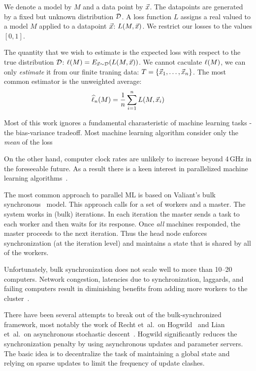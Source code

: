 We denote a model by $M$ and a data point by $\vec{x}$. The datapoints are
generated by a fixed but unknown distribution ${\cal D}$. A loss function $L$
assigns a real valued to a model $M$ applied to a datapoint $\vec{x}$:
$L(M,\vec{x})$. We restrict our losses to the values $[0,1]$.

The quantity that we wish to estimate is the expected loss with
respect to the true distribution ${\cal D}$: $\ell(M) = E_{\vec{x} \sim
  {\cal D}}(L(M,\vec{x}))$. We cannot caculate $\ell(M)$, we can only
{\em estimate} it from our finite traning data: $T = \{ \vec{x}_1, \ldots,
\vec{x}_n\}$. The most common estimator is the unweighted average:
$$ \widehat{\ell}_n(M) = \frac{1}{n} \sum_{i=1}^n L(M,\vec{x}_i)$$




Most of this work ignores a fundamental charasteristic
of machine learning tasks - the bias-variance tradeoff. Most machine
learning algorithm consider only the {\em mean} of the loss

On the other hand, computer clock rates are unlikely to increase
beyond 4\,GHz in the foreseeable future.  As a result there is a keen
interest in parallelized machine
learning algorithms~\cite{bekkerman_scaling_2012}.

The most common approach to parallel ML is based on Valiant's bulk
synchronous~\cite{valiant_bridging_1990} model. This approach calls for a
set of workers and a master. The system works in (bulk) iterations. In each iteration
the master sends a task to each worker and then waits for its
response. Once {\em all} machines responded, the master proceeds to the
next iteration. Thus the head node enforces synchronization (at the
iteration level) and maintains
a state that is shared by all of the workers.

Unfortunately, bulk synchronization does not scale well to more than
10--20 computers. Network congestion, latencies due to synchronization,
laggards, and failing computers result in diminishing benefits from
adding more workers to the
cluster~\cite{zaharia_apache_2016,mcsherry_scalability!_2015}.

There have been several attempts to break out of the bulk-synchronized
framework, most notably the work of Recht et~al.\ on
Hogwild~\cite{recht_hogwild:_2011} and Lian et~al.\ on asynchronous
stochastic descent~\cite{lian_asynchronous_2015}. Hogwild
significantly reduces the synchronization penalty by using
asynchronous updates and parameter servers. The basic idea is to
decentralize the task of maintaining a global state and relying on
sparse updates to limit the frequency of update clashes.

